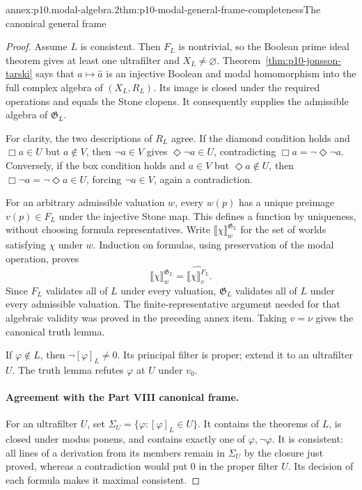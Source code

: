 \begin{annexitem}{annex:p10.modal-algebra.2}{thm:p10-modal-general-frame-completeness}{The canonical general frame}
\begin{proof}
Assume \(L\) is consistent.
Then \(F_L\) is nontrivial, so the Boolean prime ideal theorem
gives at least one ultrafilter and \(X_L\ne\varnothing\).
Theorem~\ref{thm:p10-jonsson-tarski} says that
\(a\mapsto\widehat a\) is an injective Boolean and modal
homomorphism into the full complex algebra of \((X_L,R_L)\).
Its image is closed under the required operations and equals
the Stone clopens.  It consequently supplies the admissible
algebra of \(\mathfrak G_L\).

For clarity, the two descriptions of \(R_L\) agree.
If the diamond condition holds and \(\Box a\in U\) but
\(a\notin V\), then \(\neg a\in V\) gives
\(\Diamond\neg a\in U\), contradicting
\(\Box a=\neg\Diamond\neg a\).
Conversely, if the box condition holds and \(a\in V\)
but \(\Diamond a\notin U\), then
\(\Box\neg a=\neg\Diamond a\in U\), forcing
\(\neg a\in V\), again a contradiction.

For an arbitrary admissible valuation \(w\), every \(w(p)\)
has a unique preimage \(v(p)\in F_L\) under the injective
Stone map.  This defines a function by uniqueness, without
choosing formula representatives.
Write \(\llbracket\chi\rrbracket_w^{\mathfrak G_L}\) for the set
of worlds satisfying \(\chi\) under \(w\).
Induction on formulas, using preservation of the modal operation,
proves
\[
 \llbracket\chi\rrbracket_w^{\mathfrak G_L}
       =\widehat{\llbracket\chi\rrbracket_v^{F_L}}.
\]
Since \(F_L\) validates all of \(L\) under every valuation,
\(\mathfrak G_L\) validates all of \(L\) under every admissible
valuation.  The finite-representative argument needed for that
algebraic validity was proved in the preceding annex item.
Taking \(v=\nu\) gives the canonical truth lemma.

If \(\varphi\notin L\), then \(\neg[\varphi]_L\ne0\).
Its principal filter is proper; extend it to an ultrafilter \(U\).
The truth lemma refutes \(\varphi\) at \(U\) under \(v_0\).

\paragraph{Agreement with the Part VIII canonical frame.}
For an ultrafilter \(U\), set
\(\Sigma_U=\{\varphi:[\varphi]_L\in U\}\).
It contains the theorems of \(L\), is closed under modus
ponens, and contains exactly one of \(\varphi,\neg\varphi\).
It is consistent: all lines of a derivation from its members
remain in \(\Sigma_U\) by the closure just proved, whereas a
contradiction would put \(0\) in the proper filter \(U\).
Its decision of each formula makes it maximal consistent.


\end{proof}
\end{annexitem}
